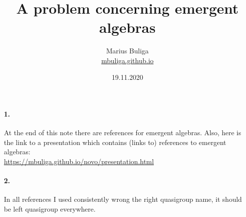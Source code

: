 \documentclass{article}
\begin{document}
\pagestyle{plain}










\newtheorem{theorem}{Theorem}[section]

\newtheorem{proposition}[theorem]{Proposition}

\newtheorem{lema}[theorem]{Lemma}

\newtheorem{corollary}[theorem]{Corollary}

\newtheorem{definition}[theorem]{Definition}

\newtheorem{remark}[theorem]{Remark}

\newtheorem{exempl}{Example}[section]

\newenvironment{example}{\begin{exempl}  \em}{\hfill $\square$

\end{exempl}}  \vspace{.5cm}









\renewcommand{\contentsname}{ }


\title{A problem concerning emergent algebras}

\author{Marius Buliga \\ \href{https://mbuliga.github.io}{mbuliga.github.io}}

\date{19.11.2020}

\maketitle



\paragraph{1.} At the end of this note there are references for emergent algebras. Also, here is the link to a presentation which contains (links to) references to emergent algebras: \\

\href{https://mbuliga.github.io/novo/presentation.html}{https://mbuliga.github.io/novo/presentation.html} \\



\paragraph{2.} In all references I used consistently wrong the right quasigroup name, it should be left quasigroup everywhere. \\
\end{document}
